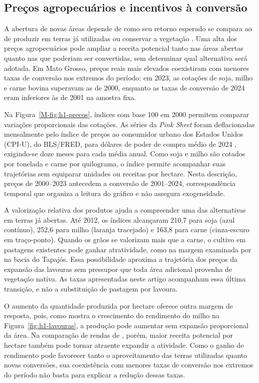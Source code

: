 \FloatBarrier
\subsection{Preços agropecuários e incentivos à conversão}
\label{descritiva-precos}

A abertura de novas áreas depende de como seu retorno esperado se compara ao de produzir em terras já utilizadas ou conservar a vegetação \cite{Angelsen2010}. Uma alta dos preços agropecuários pode ampliar a receita potencial tanto nas áreas abertas quanto nas que poderiam ser convertidas, sem determinar qual alternativa será adotada. Em Mato Grosso, preços reais mais elevados coexistiram com menores taxas de conversão nos extremos do período: em 2023, as cotações de soja, milho e carne bovina superavam as de 2000, enquanto as taxas de conversão de 2024 eram inferiores às de 2001 na amostra fixa.

Na Figura~\ref{M-fig:h1-precos}, índices com base 100 em 2000 permitem comparar variações proporcionais das cotações. As séries da \textit{Pink Sheet} \cite{WorldBank2026} foram deflacionadas mensalmente pelo índice de preços ao consumidor urbano dos Estados Unidos (CPI-U), do BLS/FRED, para dólares de poder de compra médio de 2024 \cite{BLSCPI2026}, exigindo-se doze meses para cada média anual. Como soja e milho são cotados por tonelada e carne por quilograma, o índice permite acompanhar suas trajetórias sem equiparar unidades ou receitas por hectare. Nesta descrição, preços de 2000--2023 antecedem a conversão de 2001--2024, correspondência temporal que organiza a leitura do gráfico e não assegura exogeneidade.



A valorização relativa dos produtos ajuda a compreender uma das alternativas em terras já abertas. Até 2012, os índices alcançaram 210,7 para soja (azul contínuo), 252,6 para milho (laranja tracejado) e 163,8 para carne (cinza-escuro em traço-ponto). Quando os grãos se valorizam mais que a carne, o cultivo em pastagens existentes pode ganhar atratividade, como na margem examinada por  na bacia do Tapajós. Essa possibilidade aproxima a trajetória dos preços da expansão das lavouras sem pressupor que toda área adicional provenha de vegetação nativa. As taxas apresentadas neste artigo acompanham essa última transição, e não a substituição de pastagem por lavoura.

O aumento da quantidade produzida por hectare oferece outra margem de resposta, pois, como mostra o crescimento do rendimento do milho na Figura~\ref{fig:h1-lavouras}, a produção pode aumentar sem expansão proporcional da área. Na comparação de rendas de , porém, maior receita potencial por hectare também pode tornar atraente expandir a atividade. Como o ganho de rendimento pode favorecer tanto o aproveitamento das terras utilizadas quanto novas conversões, sua coexistência com menores taxas de conversão nos extremos do período não basta para explicar a redução dessas taxas.


